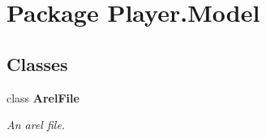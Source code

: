 \section{Package Player.\-Model}
\label{namespace_player_1_1_model}
\subsection*{Classes}
\begin{DoxyCompactItemize}
\item 
class {\bf Arel\-File}
\begin{DoxyCompactList}\small\item\em An arel file. \end{DoxyCompactList}\end{DoxyCompactItemize}
